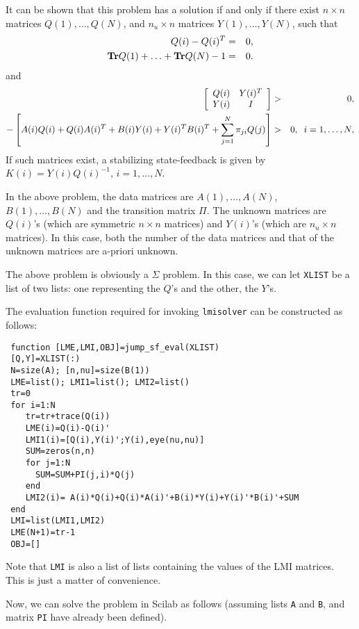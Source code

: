 \documentclass{article}
\begin{document}
It can be shown that this problem has a solution if and only if
there exist $n \times n$ matrices  $Q(1),\ldots,Q(N)$, and $n_u \times n$
matrices $Y(1),\ldots,Y(N)$, such that  
\begin{eqnarray*}
Q(i)- Q(i)^T&=& 0 , \\
{\mathop{\bf Tr}} Q(1)+ \ldots +{\mathop{\bf Tr}} Q(N) -1 &=& 0.
\end{eqnarray*}
and
\begin{eqnarray*}
\left[ \begin{array}{cc} Q(i) & Y(i)^T \\ Y(i) & I \end{array}\right] &>&0, \\
- \left[ A(i)Q(i)+Q(i)A(i)^{T} + B(i)Y(i)+Y(i)^TB(i)^{T}+
\displaystyle\sum_{j=1}^{N}\pi_{ji}Q(j) \right] &>& 0, \;\; i = 1,\ldots,N, \\
\end{eqnarray*}
If such matrices exist, a stabilizing
state-feedback is given by $K(i) = Y(i)Q(i)^{-1}$, $i=1,\ldots,N$.

In the above problem, the data matrices are $A(1),\ldots,A(N)$,
$B(1),\ldots,B(N)$ and the transition matrix $\Pi$.  The unknown 
matrices are $Q(i)$'s (which are symmetric $n \times n$ matrices) and
$Y(i)$'s (which are $n_u \times n$ matrices). In this case, both
the number of the data matrices and that of the unknown matrices
are a-priori unknown. 

The above problem is obviously a $\Sigma$ problem.  In this case,
we can let {\tt XLIST} be a list of two lists: one representing
the $Q$'s and the other, the $Y$'s.

The evaluation function required for invoking {\tt lmisolver} can be constructed as
follows:
\begin{verbatim}
 function [LME,LMI,OBJ]=jump_sf_eval(XLIST)
 [Q,Y]=XLIST(:)
 N=size(A); [n,nu]=size(B(1))
 LME=list(); LMI1=list(); LMI2=list()
 tr=0
 for i=1:N
    tr=tr+trace(Q(i))
    LME(i)=Q(i)-Q(i)'
    LMI1(i)=[Q(i),Y(i)';Y(i),eye(nu,nu)]
    SUM=zeros(n,n)
    for j=1:N
      SUM=SUM+PI(j,i)*Q(j)
    end
    LMI2(i)= A(i)*Q(i)+Q(i)*A(i)'+B(i)*Y(i)+Y(i)'*B(i)'+SUM
 end
 LMI=list(LMI1,LMI2)
 LME(N+1)=tr-1
 OBJ=[]
\end{verbatim}
Note that {\tt LMI} is also a list of lists containing the values
of the LMI matrices. This is just a matter of convenience.

Now, we can solve the problem in
Scilab as follows (assuming lists {\tt A} and {\tt B}, and  matrix
{\tt PI} have already been defined).
\end{document}
